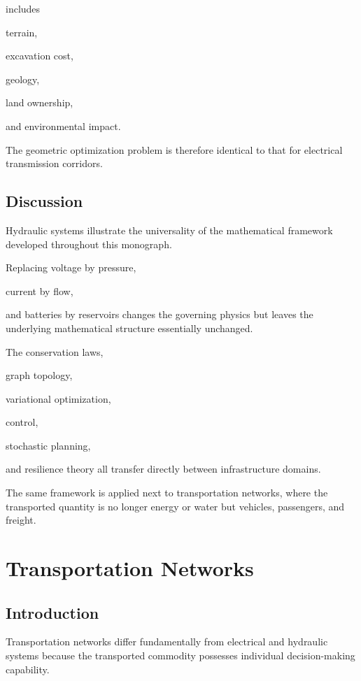 \documentclass[11pt,fleqn]{book}
\numberwithin{equation}{chapter}
\theoremstyle{plain}
\theoremstyle{definition}
\theoremstyle{remark}
\begin{document}
includes

terrain,

excavation cost,

geology,

land ownership,

and environmental impact.

The geometric optimization problem is therefore identical to that for
electrical transmission corridors.


\section{Discussion}

Hydraulic systems illustrate the universality of the mathematical
framework developed throughout this monograph.

Replacing voltage by pressure,

current by flow,

and batteries by reservoirs changes the governing physics but leaves the
underlying mathematical structure essentially unchanged.

The conservation laws,

graph topology,

variational optimization,

control,

stochastic planning,

and resilience theory all transfer directly between infrastructure
domains.

The same framework is applied next to transportation
networks, where the transported quantity is no longer energy or water
but vehicles, passengers, and freight.

\chapter{Transportation Networks}

\section{Introduction}

Transportation networks differ fundamentally from electrical and
hydraulic systems because the transported commodity possesses individual
decision-making capability.
\end{document}
